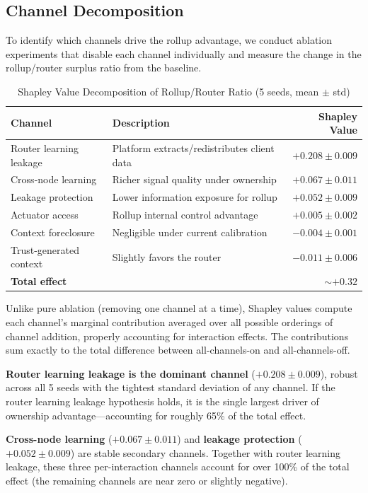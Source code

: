\documentclass[12pt]{article}
\theoremstyle{definition}
\begin{document}
\subsection{Channel Decomposition}

To identify which channels drive the rollup advantage, we conduct ablation experiments that disable each channel individually and measure the change in the rollup/router surplus ratio from the baseline.

\begin{table}[H]
\centering
\caption{Shapley Value Decomposition of Rollup/Router Ratio (5 seeds, mean $\pm$ std)}
\label{tab:shapley}
\begin{tabular}{llr}
\toprule
Channel & Description & Shapley Value \\
\midrule
Router learning leakage & Platform extracts/redistributes client data & $+0.208 \pm 0.009$ \\
Cross-node learning & Richer signal quality under ownership & $+0.067 \pm 0.011$ \\
Leakage protection & Lower information exposure for rollup & $+0.052 \pm 0.009$ \\
Actuator access & Rollup internal control advantage & $+0.005 \pm 0.002$ \\
Context foreclosure & Negligible under current calibration & $-0.004 \pm 0.001$ \\
Trust-generated context & Slightly favors the router & $-0.011 \pm 0.006$ \\
\midrule
\textbf{Total effect} & & $\mathbf{\sim +0.32}$ \\
\bottomrule
\end{tabular}
\end{table}

Unlike pure ablation (removing one channel at a time), Shapley values compute each channel's marginal contribution averaged over all possible orderings of channel addition, properly accounting for interaction effects. The contributions sum exactly to the total difference between all-channels-on and all-channels-off.

\textbf{Router learning leakage is the dominant channel} ($+0.208 \pm 0.009$), robust across all 5 seeds with the tightest standard deviation of any channel. If the router learning leakage hypothesis holds, it is the single largest driver of ownership advantage---accounting for roughly 65\% of the total effect.

\textbf{Cross-node learning} ($+0.067 \pm 0.011$) and \textbf{leakage protection} ($+0.052 \pm 0.009$) are stable secondary channels. Together with router learning leakage, these three per-interaction channels account for over 100\% of the total effect (the remaining channels are near zero or slightly negative).
\end{document}
